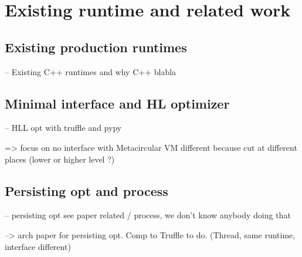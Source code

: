 \documentclass[a4paper,12pt,twoside]{../includes/ThesisStyle}
\begin{document}
\fi

\chapter{Existing runtime and related work}
\label{chap:comparison}
\minitoc

\section{Existing production runtimes}
-- Existing C++ runtimes and why C++ blabla

\section{Minimal interface and HL optimizer}
-- HLL opt with truffle and pypy

=> focus on no interface with Metacircular VM
different because cut at different places (lower or higher level ?)

\section{Persisting opt and process}
-- persisting opt see paper related / process, we don't know anybody doing that

--> arch paper for persisting opt. Comp to Truffle to do. (Thread, same runtime, interface different)


\ifx\wholebook\relax\else
    
\end{document}
